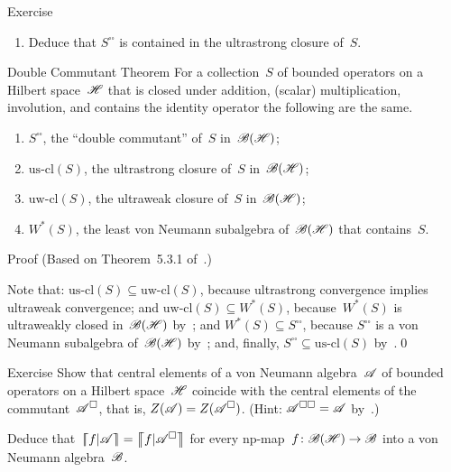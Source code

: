 \documentclass[a]{subfiles}
\begin{document}
\begin{parsec}
\begin{point}{Exercise}
\begin{point}
\begin{enumerate}
\item
Deduce that $S^{\square\square}$
is contained in the ultrastrong closure of~$S$.
\end{enumerate}
\end{point}
\end{point}
\begin{point}{Double Commutant Theorem}%
For a collection~$S$ of bounded operators
on a Hilbert space~$\mathscr{H}$
that is closed under addition, (scalar) multiplication,
involution, and contains the identity operator
the following are the same.
\begin{enumerate}
\item
$S^{\square\square}$, the ``double commutant'' of~$S$
in~$\mathscr{B}(\mathscr{H})$;
\item
$\mathrm{us}\text{-}\mathrm{cl}(S)$,
the ultrastrong closure of~$S$ in~$\mathscr{B}(\mathscr{H})$;
\item
$\mathrm{uw}\text{-}\mathrm{cl}(S)$,
the ultraweak closure of~$S$ in~$\mathscr{B}(\mathscr{H})$;
\item
$W^*(S)$,
the least von Neumann subalgebra of~$\mathscr{B}(\mathscr{H})$
that contains~$S$.
\end{enumerate}
\begin{point}{Proof}%
(Based on Theorem~5.3.1 of~\cite{kr}.) 

Note that: $\mathrm{us}\text{-}\mathrm{cl}(S)
\subseteq  \mathrm{uw}\text{-}\mathrm{cl}(S)$,
because ultrastrong convergence implies ultraweak convergence;
and
$\mathrm{uw}\text{-}\mathrm{cl}(S)
\subseteq W^*(S)$,
because~$W^*(S)$ 
is ultraweakly closed in~$\mathscr{B}(\mathscr{H})$ by~;
and
$W^*(S)\subseteq S^{\square\square}$,
because 
$S^{\square\square}$ is a von Neumann subalgebra
of~$\mathscr{B}(\mathscr{H})$ by~;
and, finally, $S^{\square\square}\subseteq \mathrm{us}\text{-}\mathrm{cl}(S)$
by~.\qed
\end{point}
\end{point}
\begin{point}{Exercise}
Show that central elements of
a von Neumann algebra~$\mathscr{A}$
of bounded operators on a Hilbert space~$\mathscr{H}$
coincide with the central elements of the commutant~$\mathscr{A}^\square$,
that is, $Z(\mathscr{A})=Z(\mathscr{A}^\square)$.
(Hint: $\mathscr{A}^{\square\square}=\mathscr{A}$ by~.)
\begin{point}%
Deduce that~$\cceil{f|\scrA}=\cceil{f|\scrA^\square}$
for every np-map~$f\colon \mathscr{B}(\mathscr{H})\to\mathscr{B}$ 
into a von Neumann algebra~$\mathscr{B}$.
\end{point}
\end{point}
\end{parsec}%
\end{document}
